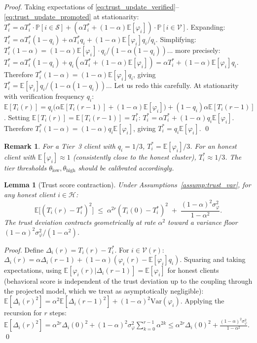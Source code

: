 \documentclass{article}
\newtheorem{lemma}[theorem]{Lemma}
\newtheorem{remark}{Remark}
\newcommand{\E}{\mathbb{E}}
\renewcommand{\Pr}{\mathbb{P}}
\newcommand{\calH}{\mathcal{H}}
\newcommand{\calV}{\mathcal{V}}
\newcommand{\calS}{\mathcal{S}}
\begin{document}
\begin{proof}
Taking expectations of \eqref{eq:trust_update_verified}--\eqref{eq:trust_update_promoted}
at stationarity: $T_i^* = \alpha T_i^* \cdot \Pr[i \in \calS] + (\alpha T_i^* + (1-\alpha)\E[\varphi_i]) \cdot \Pr[i \in \calV]$.
Expanding: $T_i^* = \alpha T_i^*(1 - q_i) + \alpha T_i^* q_i + (1-\alpha)\E[\varphi_i] q_i / q_i$.
Simplifying: $T_i^*(1 - \alpha) = (1-\alpha)\E[\varphi_i] \cdot q_i / (1 - \alpha(1-q_i))$... more precisely:
$T_i^* = \alpha T_i^*(1-q_i) + q_i(\alpha T_i^* + (1-\alpha)\E[\varphi_i])
= \alpha T_i^* + (1-\alpha)\E[\varphi_i] q_i$.
Therefore $T_i^*(1-\alpha) = (1-\alpha)\E[\varphi_i] q_i$,
giving $T_i^* = \E[\varphi_i] q_i / (1 - \alpha(1-q_i))$... 
Let us redo this carefully.
At stationarity with verification frequency $q_i$:
$\E[T_i(r)] = q_i\bigl(\alpha \E[T_i(r-1)] + (1-\alpha)\E[\varphi_i]\bigr)
+ (1-q_i)\alpha \E[T_i(r-1)]$.
Setting $\E[T_i(r)] = \E[T_i(r-1)] = T_i^*$:
$T_i^* = \alpha T_i^* + (1-\alpha) q_i \E[\varphi_i]$.
Therefore $T_i^*(1-\alpha) = (1-\alpha) q_i \E[\varphi_i]$,
giving $T_i^* = q_i \E[\varphi_i]$.
\qed
\end{proof}

\begin{remark}
For a Tier~3 client with $q_i = 1/3$, $T_i^* = \E[\varphi_i]/3$.
For an honest client with $\E[\varphi_i] \approx 1$ (consistently close
to the honest cluster), $T_i^* \approx 1/3$.
The tier thresholds $\theta_{\mathrm{low}}, \theta_{\mathrm{high}}$ should
be calibrated accordingly.
\end{remark}

\begin{lemma}[Trust score contraction]
\label{lem:trust_contract}
Under Assumptions~\ref{assump:trust_var}, for any honest client $i \in \calH$:
\[
  \E\bigl[(T_i(r) - T_i^*)^2\bigr]
  \;\leq\;
  \alpha^{2r} (T_i(0) - T_i^*)^2
  \;+\;
  \frac{(1-\alpha)^2 \sigma_\varphi^2}{1 - \alpha^2}.
\]
The trust deviation contracts geometrically at rate $\alpha^2$ toward a
variance floor $(1-\alpha)^2\sigma_\varphi^2 / (1-\alpha^2)$.
\end{lemma}

\begin{proof}
Define $\Delta_i(r) = T_i(r) - T_i^*$.
For $i \in \calV(r)$:
$\Delta_i(r) = \alpha \Delta_i(r-1) + (1-\alpha)(\varphi_i(r) - \E[\varphi_i] q_i)$.
Squaring and taking expectations, using $\E[\varphi_i(r)|\Delta_i(r-1)] = \E[\varphi_i]$
for honest clients (behavioral score is independent of the trust deviation
up to the coupling through the projected model, which we treat as asymptotically
negligible):
$\E[\Delta_i(r)^2] = \alpha^2 \E[\Delta_i(r-1)^2] + (1-\alpha)^2 \mathrm{Var}(\varphi_i)$.
Applying the recursion for $r$ steps:
$\E[\Delta_i(r)^2] = \alpha^{2r}\Delta_i(0)^2 + (1-\alpha)^2\sigma_\varphi^2 \sum_{k=0}^{r-1}\alpha^{2k}
\leq \alpha^{2r}\Delta_i(0)^2 + \frac{(1-\alpha)^2\sigma_\varphi^2}{1-\alpha^2}$.
\qed
\end{proof}
\end{document}
